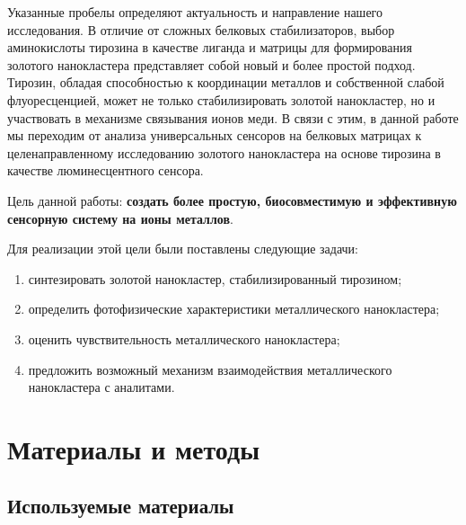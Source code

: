 \documentclass[a4paper, 12pt]{article}
\begin{document}
\begin{onehalfspace}
	Указанные пробелы определяют актуальность и направление нашего исследования. В отличие от сложных белковых стабилизаторов, выбор аминокислоты тирозина в качестве лиганда и матрицы для формирования золотого нанокластера представляет собой новый и более простой подход.
	Тирозин, обладая способностью к координации металлов и собственной слабой флуоресценцией, может не только стабилизировать золотой нанокластер, но и участвовать в механизме связывания ионов меди. В связи с этим, в данной работе мы переходим от анализа универсальных сенсоров на белковых матрицах к целенаправленному исследованию золотого нанокластера на основе тирозина в качестве люминесцентного сенсора.

	Цель данной работы: \textbf{создать более простую, биосовместимую и эффективную сенсорную систему на ионы металлов}.

	Для реализации этой цели были поставлены следующие задачи:
	\begin{enumerate}
		\item синтезировать золотой нанокластер, стабилизированный тирозином;
		\item определить фотофизические характеристики металлического нанокластера;
		\item оценить чувствительность металлического нанокластера;
		\item предложить возможный механизм взаимодействия металлического нанокластера с аналитами.
	\end{enumerate}



\newpage
\section*{Материалы и методы}

	\subsection*{Используемые материалы}


\end{onehalfspace}
\end{document}
